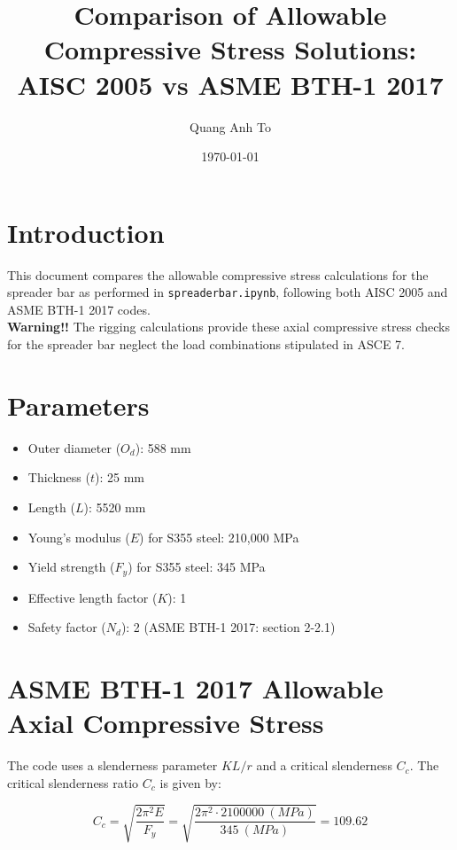 \documentclass[12pt]{article}
\begin{document}
\title{Comparison of Allowable Compressive Stress Solutions: \\ AISC 2005 vs ASME BTH-1 2017}
\author{Quang Anh To}
\date{\today}
\maketitle

\tableofcontents

\pagebreak

\section{Introduction}
\noindent This document compares the allowable compressive stress calculations for the spreader bar as performed in \texttt{spreaderbar.ipynb}, following both AISC 2005 and ASME BTH-1 2017 codes. \\

\noindent \textbf{Warning!!} 
The rigging calculations provide these axial compressive stress checks for the spreader bar neglect the load combinations stipulated in ASCE 7.

\section{Parameters}
\begin{itemize}
    \item Outer diameter ($O_d$): 588 mm
    \item Thickness ($t$): 25 mm
    \item Length ($L$): 5520 mm
    \item Young's modulus ($E$) for S355 steel: 210,000 MPa
    \item Yield strength ($F_y$) for S355 steel: 345 MPa
    \item Effective length factor ($K$): 1
    \item Safety factor ($N_d$): 2 (ASME BTH-1 2017: section 2-2.1)
\end{itemize}

\section{ASME BTH-1 2017 Allowable Axial Compressive Stress}
The code uses a slenderness parameter $KL/r$ and a critical slenderness $C_c$.
The critical slenderness ratio $C_c$ is given by:

\[
    C_c = \sqrt{\frac{2\pi^2 E}{F_y}} = \sqrt{\frac{2\pi^2 \cdot 2100000 \ (MPa)}{345 \ (MPa)}} = 109.62
\]
\end{document}
